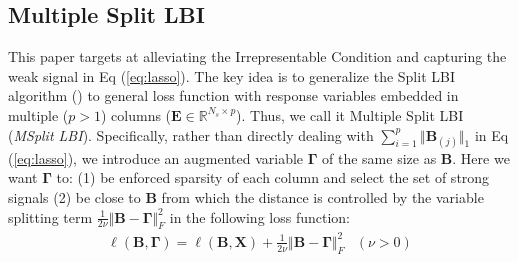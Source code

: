 \documentclass{article}
\begin{document}
\subsection{Multiple Split LBI\label{subsec:Multiple-Split-LBI}}


This paper targets at alleviating the Irrepresentable Condition and
capturing the weak signal in Eq (\ref{eq:lasso}). The key idea is
to generalize the Split LBI algorithm (\citet{Splitlbi}) to general
loss function with response variables embedded in multiple ($p>1$)
columns ($\mathbf{E}\in\mathbb{R}^{N_{s}\times p}$). Thus, we call
it Multiple Split LBI (\emph{MSplit LBI}). Specifically, rather than
directly dealing with $\sum_{i=1}^{p}\Vert\mathbf{B}_{(j)}\Vert_{1}$
in Eq (\ref{eq:lasso}), we introduce an augmented variable $\mathbf{\Gamma}$
of the same size as $\mathbf{B}$. Here we want $\mathbf{\Gamma}$
to: (1) be enforced sparsity of each column and select the set of
strong signals (2) be close to $\mathbf{B}$ from which the distance
is controlled by the variable splitting term $\frac{1}{2\nu}\Vert\mathbf{B}-\mathbf{\Gamma}\Vert_{F}^{2}$
in the following loss function:
\begin{align}
\ell(\mathbf{B},\mathbf{\Gamma})=\ell(\mathbf{B},\mathbf{X})+\frac{1}{2\nu}\Vert\mathbf{B}-\mathbf{\Gamma}\Vert_{F}^{2} & \left(\nu>0\right)\label{eq:split-loss}
\end{align}
\end{document}
